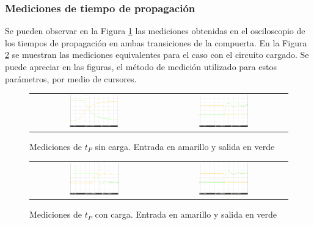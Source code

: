 \subsubsection{Mediciones de tiempo de propagaci\'on}
Se pueden observar en la Figura \ref{fig:PROP_NOLOAD} las mediciones obtenidas en el osciloscopio de los tiempos de propagaci\'on en ambas transiciones de la compuerta. En la Figura \ref{fig:PROP_LOAD} se muestran las mediciones equivalentes para el caso con el circuito cargado.
Se puede apreciar en las figuras, el m\'etodo de medici\'on utilizado para estos par\'ametros, por medio de cursores.
\begin{figure}[H]
    \centering
    \begin{tabular}{c c}
        \includegraphics[width=0.4\textwidth]{../EJ4/Recursos/PROP_NOLOAD_FALL} &
        \includegraphics[width=0.4\textwidth]{../EJ4/Recursos/PROP_NOLOAD_RISE}
    \end{tabular}
    \caption{Mediciones de $t_P$ sin carga. Entrada en amarillo y salida en verde}
    \label{fig:PROP_NOLOAD}
\end{figure} 
\begin{figure}[H]
    \centering
    \begin{tabular}{c c}
        \includegraphics[width=0.4\textwidth]{../EJ4/Recursos/PROP_LOAD_FALL} &
        \includegraphics[width=0.4\textwidth]{../EJ4/Recursos/PROP_LOAD_RISE}
    \end{tabular}
    \caption{Mediciones de $t_P$ con carga. Entrada en amarillo y salida en verde}
    \label{fig:PROP_LOAD}
\end{figure} 
